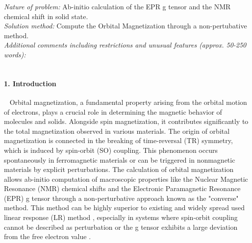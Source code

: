 \documentclass[final,3p,times,twocolumn]{elsarticle}
\begin{document}
\begin{small}
{\em Nature of problem:} Ab-initio calculation of the EPR g tensor and the NMR chemical shift in solid state.\\
{\em Solution method:} Compute the Orbital Magnetization through a non-pertubative method. \\
{\em Additional comments including restrictions and unusual features (approx. 50-250 words):}\\
   \\
\paragraph{1. Introduction} \ 
\vskip0.5cm
\noindent
Orbital magnetization, a fundamental property arising from the orbital motion of electrons, plays a crucial role in determining the magnetic behavior of molecules and solids. Alongside spin magnetization, it contributes significantly to the total magnetization observed in various materials. The origin of orbital magnetization is connected in the breaking of time-reversal (TR) symmetry, which is induced by spin-orbit (SO) coupling. This phenomenon occurs spontaneously in ferromagnetic materials or can be triggered in nonmagnetic materials by explicit perturbations.
The calculation of orbital magnetization allows ab-initio computation of macroscopic properties like the Nuclear Magnetic Resonance (NMR) chemical shifts and the Electronic Paramagnetic Resonance (EPR) g tensor through a non-perturbative approach known as the "converse" method. This method can be highly superior to existing and widely spread used linear response (LR) method \cite{PhysRevLett.88.086403}, especially in systems where spin-orbit coupling cannot be described as perturbation or the g tensor exhibits a large deviation from the free electron value \cite{PhysRevB.81.060409,PhysRevB.81.195208}.

\end{small}
\end{document}
